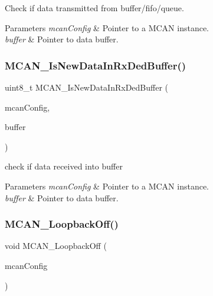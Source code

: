 Check if data transmitted from buffer/fifo/queue. 


\begin{DoxyParams}{Parameters}
{\em mcan\+Config} & Pointer to a M\+C\+AN instance. \\
\hline
{\em buffer} & Pointer to data buffer. \\
\hline
\end{DoxyParams}
\mbox{\label{group__can__module_ga6d84b91cbb497467aedb98b53af1db45}} 
\subsubsection{\texorpdfstring{MCAN\_IsNewDataInRxDedBuffer()}{MCAN\_IsNewDataInRxDedBuffer()}}
{\footnotesize\ttfamily uint8\+\_\+t M\+C\+A\+N\+\_\+\+Is\+New\+Data\+In\+Rx\+Ded\+Buffer (\begin{DoxyParamCaption}\item[{const \mbox{\hyperlink{structMCan__ConfigTag}{M\+Can\+\_\+\+Config\+Type}} $\ast$}]{mcan\+Config,  }\item[{uint8\+\_\+t}]{buffer }\end{DoxyParamCaption})}



check if data received into buffer 


\begin{DoxyParams}{Parameters}
{\em mcan\+Config} & Pointer to a M\+C\+AN instance. \\
\hline
{\em buffer} & Pointer to data buffer. \\
\hline
\end{DoxyParams}
\mbox{\label{group__can__module_ga7e36eef54b4e8a426a10c540de9457be}} 
\subsubsection{\texorpdfstring{MCAN\_LoopbackOff()}{MCAN\_LoopbackOff()}}
{\footnotesize\ttfamily void M\+C\+A\+N\+\_\+\+Loopback\+Off (\begin{DoxyParamCaption}\item[{const \mbox{\hyperlink{structMCan__ConfigTag}{M\+Can\+\_\+\+Config\+Type}} $\ast$}]{mcan\+Config }\end{DoxyParamCaption})}



